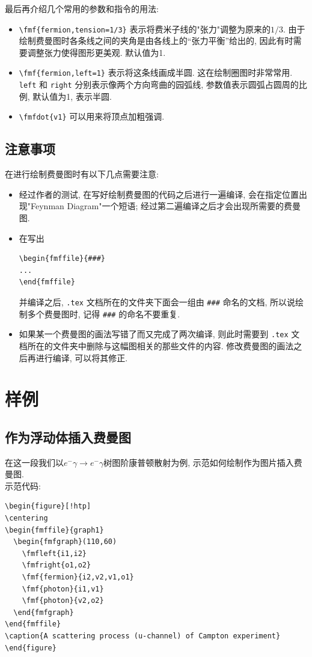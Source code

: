 \documentclass{article}
\begin{document}
最后再介绍几个常用的参数和指令的用法:
\begin{itemize}
\item \verb+\fmf{fermion,tension=1/3}+ 表示将费米子线的"张力"调整为原来的$1/3$. 由于绘制费曼图时各条线之间的夹角是由各线上的``张力平衡''给出的, 因此有时需要调整张力使得图形更美观. 默认值为1.
\item \verb+\fmf{fermion,left=1}+ 表示将这条线画成半圆. 这在绘制圈图时非常常用. \verb+left+ 和 \verb+right+ 分别表示像两个方向弯曲的园弧线, 参数值表示圆弧占圆周的比例, 默认值为1, 表示半圆.
\item \verb+\fmfdot{v1}+ 可以用来将顶点加粗强调.
\end{itemize}

\subsection{注意事项}
在进行绘制费曼图时有以下几点需要注意:
\begin{itemize}
\item
经过作者的测试, 在写好绘制费曼图的代码之后进行一遍编译, 会在指定位置出现"Feynman Diagram"一个短语; 经过第二遍编译之后才会出现所需要的费曼图.
\item
在写出
\begin{verbatim}
\begin{fmffile}{###}
...
\end{fmffile}
\end{verbatim}
并编译之后, \verb+.tex+ 文档所在的文件夹下面会一组由 \verb+###+ 命名的文档, 所以说绘制多个费曼图时, 记得 \verb+###+ 的命名不要重复.
\item 如果某一个费曼图的画法写错了而又完成了两次编译, 则此时需要到 \verb+.tex+ 文档所在的文件夹中删除与这幅图相关的那些文件的内容. 修改费曼图的画法之后再进行编译, 可以将其修正.
\end{itemize}

\section{样例}
\subsection{作为浮动体插入费曼图}
在这一段我们以$e^{-}\gamma\rightarrow e^{-}\gamma$树图阶康普顿散射为例, 示范如何绘制作为图片插入费曼图.\\
示范代码:
\begin{verbatim}
\begin{figure}[!htp]
\centering
\begin{fmffile}{graph1}
  \begin{fmfgraph}(110,60)
    \fmfleft{i1,i2}
    \fmfright{o1,o2}
    \fmf{fermion}{i2,v2,v1,o1}
    \fmf{photon}{i1,v1}
    \fmf{photon}{v2,o2}
  \end{fmfgraph}
\end{fmffile}
\caption{A scattering process (u-channel) of Campton experiment}
\end{figure}
\end{verbatim}
\end{document}
